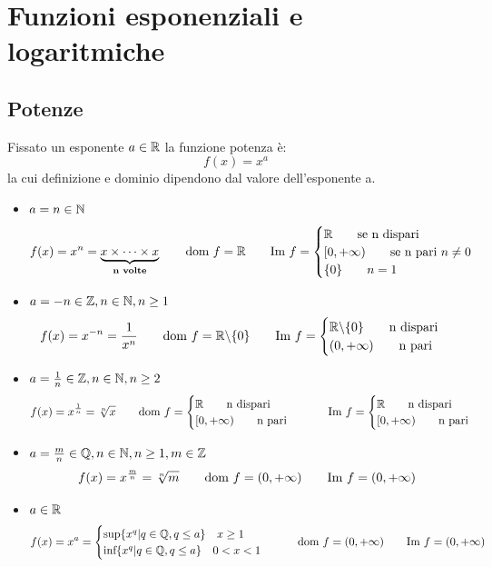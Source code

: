 
\chapter{Funzioni esponenziali e logaritmiche } %

\label{ch:esponenziali-logaritmi} %

\section{Potenze}
Fissato un esponente $a \in \mathbb{R}$ la funzione potenza è:
\[f(x)=x^a\]
la cui definizione e dominio dipendono dal valore dell’esponente a.
\begin{itemize}
\item $a=n \in \mathbb{N}$
\[f(x)=x^n= \underbrace{x \times \dots \times x}_{\textbf{n volte}} \qquad \text{dom } f=\mathbb{R} \qquad \text{Im } f= 
\begin{cases}
		\mathbb{R} \qquad \text{se n dispari} \\
		[0,+\infty )  \qquad \text{se n pari } n \neq 0 \\
		\{0\}  \qquad n = 1
\end{cases}\]

\item $a=-n\in \mathbb{Z} , n\in \mathbb{N} ,n \geq 1$
\[f(x)=x^{-n}=\frac{1}{x^n} \qquad \text{dom } f = \mathbb{R} \backslash \{0\} \qquad \text{Im } f=
\begin{cases}
		\mathbb{R} \backslash \{0\} \qquad \text{n dispari} \\
		(0,+\infty )  \qquad \text{n pari }
\end{cases}
\]
\item $a=\frac{1}{n} \in \mathbb{Z} , n\in \mathbb{N} ,n \geq 2$
\[f(x)=x^{\frac{1}{n}}=\sqrt[n]{x} \qquad 
\dom f = 
\begin{cases}
		\R \qquad \text{n dispari} \\
		[0,+\infty )  \qquad \text{n pari }
\end{cases}
\qquad \im f=
\begin{cases}
		\R \qquad \text{n dispari} \\
		[0,+\infty) \qquad \text{n pari }
\end{cases}
\]

\item $a=\frac{m}{n} \in \mathbb{Q} , n\in \mathbb{N} ,n \geq 1 , m \in \mathbb{Z}$
\[f(x)=x^{\frac{m}{n}}=\sqrt[n]{m} \qquad 
\text{dom } f = (0,+\infty)
\qquad \text{Im } f=(0,+\infty)\]

\item $a \in \mathbb{R}$
\[f(x)=x^a=
\begin{cases}
	\text{sup}\{x^q | q \in \mathbb{Q} , q \leq a\} \quad x \geq 1 \\
	\text{inf} \{x^q | q\in \mathbb{Q} , q \leq a\} \quad 0 < x < 1
\end{cases}
\qquad
\text{dom } f = (0, + \infty)
\qquad
\text{Im } f = (0, + \infty)
\]


\end{itemize}


